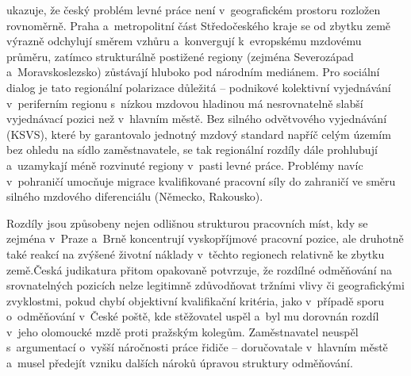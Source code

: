 ukazuje, že český problém levné práce není v~geografickém prostoru rozložen rovnoměrně. Praha a~metropolitní část Středočeského kraje se od zbytku země výrazně odchylují směrem vzhůru a~konvergují k~evropskému mzdovému průměru, zatímco strukturálně postižené regiony (zejména Severozápad a~Moravskoslezsko) zůstávají hluboko pod národním mediánem. Pro sociální dialog je tato regionální polarizace důležitá -- podnikové kolektivní vyjednávání v~periferním regionu s~nízkou mzdovou hladinou má nesrovnatelně slabší vyjednávací pozici než v~hlavním městě. Bez silného odvětvového vyjednávání (\acs{KSVS}), které by garantovalo jednotný mzdový standard napříč celým územím bez ohledu na sídlo zaměstnavatele, se tak regionální rozdíly dále prohlubují a~uzamykají méně rozvinuté regiony v~pasti levné práce. Problémy navíc v~pohraničí umocňuje migrace kvalifikované pracovní síly do zahraničí ve směru silného mzdového diferenciálu (Německo, Rakousko).\par
Rozdíly jsou způsobeny nejen odlišnou strukturou pracovních míst, kdy se zejména  v~Praze a~Brně koncentrují vyskopříjmové pracovní pozice, ale druhotně také reakcí na zvýšené životní náklady v~těchto regionech relativně ke zbytku země.Česká judikatura přitom opakovaně potvrzuje, že rozdílné odměňování na srovnatelných pozicích nelze legitimně zdůvodňovat tržními vlivy či geografickými zvyklostmi, pokud chybí objektivní kvalifikační kritéria, jako v~případě sporu o~odměňování v~České poště, kde stěžovatel uspěl a~byl mu dorovnán rozdíl v~jeho olomoucké mzdě proti pražským kolegům. Zaměstnavatel neuspěl s~argumentací o~vyšší náročnosti práce řidiče -- doručovatale v~hlavním městě a~musel předejít vzniku dalších nároků úpravou struktury odměňování.~\cite{uscr_i_us_2820_20}\par


